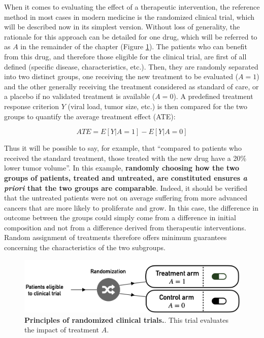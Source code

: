 \documentclass[a4paper,12pt,twoside,onecolumn,openright,final,oldfontcommands]{memoir}
\begin{document}
When it comes to evaluating the effect of a therapeutic intervention,
the reference method in most cases in modern medicine is the randomized
clinical trial, which will be described now in its simplest version.
Without loss of generality, the rationale for this approach can be
detailed for one drug, which will be referred to as \(A\) in the
remainder of the chapter (Figure \ref{fig:trials}). The patients who can
benefit from this drug, and therefore those eligible for the clinical
trial, are first of all defined (specific disease, characteristics,
etc.). Then, they are randomly separated into two distinct groups, one
receiving the new treatment to be evaluated (\(A=1\)) and the other
generally receiving the treatment considered as standard of care, or a
placebo if no validated treatment is available (\(A=0\)). A predefined
treatment response criterion \(Y\) (viral load, tumor size, etc.) is
then compared for the two groups to quantify the average treatment
effect (ATE):

\[ATE= E[Y|A=1]-E[Y|A=0]\]

Thus it will be possible to say, for example, that ``compared to
patients who received the standard treatment, those treated with the new
drug have a 20\% lower tumor volume''. In this example, \textbf{randomly
choosing how the two groups of patients, treated and untreated, are
constituted ensures \emph{a priori} that the two groups are comparable}.
Indeed, it should be verified that the untreated patients were not on
average suffering from more advanced cancers that are more likely to
proliferate and grow. In this case, the difference in outcome between
the groups could simply come from a difference in initial composition
and not from a difference derived from therapeutic interventions. Random
assignment of treatments therefore offers minimum guarantees concerning
the characteristics of the two subgroups.

\begin{figure}

{\centering \includegraphics[width=0.9\linewidth]{fig/trials} 

}

\caption[Principles of randomized clinical]{\textbf{Principles of randomized clinical trials.}.
This trial evaluates the impact of treatment \(A\).}\label{fig:trials}
\end{figure}
\end{document}
